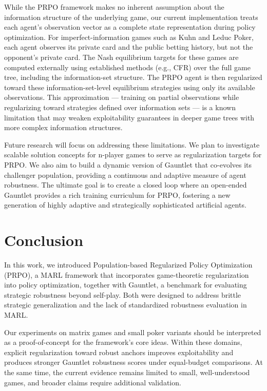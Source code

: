 \documentclass[sigconf,anonymous]{aamas}
\begin{document}
While the PRPO framework makes no inherent assumption about the information structure of the underlying game, our current implementation treats each agent's observation vector as a complete state representation during policy optimization. For imperfect-information games such as Kuhn and Leduc Poker, each agent observes its private card and the public betting history, but not the opponent's private card. The Nash equilibrium targets for these games are computed externally using established methods (e.g., CFR) over the full game tree, including the information-set structure. The PRPO agent is then regularized toward these information-set-level equilibrium strategies using only its available observations. This approximation --- training on partial observations while regularizing toward strategies defined over information sets --- is a known limitation that may weaken exploitability guarantees in deeper game trees with more complex information structures.

Future research will focus on addressing these limitations. We plan to investigate scalable solution concepts for n-player games to serve as regularization targets for PRPO. We also aim to build a dynamic version of Gauntlet that co-evolves its challenger population, providing a continuous and adaptive measure of agent robustness. The ultimate goal is to create a closed loop where an open-ended Gauntlet provides a rich training curriculum for PRPO, fostering a new generation of highly adaptive and strategically sophisticated artificial agents.



\section{Conclusion}

In this work, we introduced Population-based Regularized Policy Optimization (PRPO), a MARL framework that incorporates game-theoretic regularization into policy optimization, together with Gauntlet, a benchmark for evaluating strategic robustness beyond self-play. Both were designed to address brittle strategic generalization and the lack of standardized robustness evaluation in MARL.

Our experiments on matrix games and small poker variants should be interpreted as a proof-of-concept for the framework's core ideas. Within these domains, explicit regularization toward robust anchors improves exploitability and produces stronger Gauntlet robustness scores under equal-budget comparisons. At the same time, the current evidence remains limited to small, well-understood games, and broader claims require additional validation.
\end{document}
